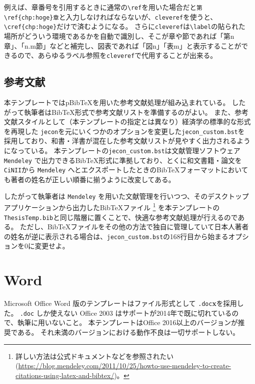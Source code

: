 				例えば、章番号を引用するときに通常の\verb|\ref|を用いた場合だと\verb|第\ref{chp:hoge}章|と入力しなければならないが、\texttt{cleveref}を使うと、\verb|\cref{chp:hoge}|だけで済むようになる。
				さらに\texttt{cleveref}は\verb|\label|の貼られた場所がどういう環境であるかを自動で識別し、そこが章や節であれば「第n章」、「n.m節」などと補完し、図表であれば「図n」「表m」と表示することができるので、あらゆるラベル参照を\texttt{cleveref}で代用することが出来る。


			\subsection{参考文献}
				\label{sub:bibtex}

				本テンプレートではpBibTeXを用いた参考文献処理が組み込まれている。
				したがって執筆者はBibTeX形式で参考文献リストを準備するのがよい。
				また、参考文献スタイルとして（本テンプレートの指定とは異なり）経済学の標準的な形式を再現した \texttt{jecon}を元にいくつかのオプションを変更した\texttt{jecon\_custom.bst}を採用しており、和書・洋書が混在した参考文献リストが見やすく出力されるようになっている。
				本テンプレートの\texttt{jecon\_custom.bst}は文献管理ソフトウェア \texttt{Mendeley} で出力できるBibTeX形式に準拠しており、とくに和文書籍・論文を \texttt{CiNII}から \texttt{Mendeley} へとエクスポートしたときのBibTeXフォーマットにおいても著者の姓名が正しい順番に揃うように改変してある。

				したがって執筆者は \texttt{Mendeley} を用いた文献管理を行いつつ、そのデスクトップアプリケーションから出力したBibTeXファイル
				\footnote{詳しい方法は公式ドキュメントなどを参照されたい
				(\url{https://blog.mendeley.com/2011/10/25/howto-use-mendeley-to-create-citations-using-latex-and-bibtex/})。}
				を本テンプレートの\texttt{ThesisTemp.bib}と同じ階層に置くことで、快適な参考文献処理が行えるのである。
				ただし、BibTeXファイルをその他の方法で独自に管理していて日本人著者の姓名が逆に表示される場合は、\verb|jecon_custom.bst|の168行目から始まるオプションを0に変更せよ。

	\section{Word}
		\label{word}

		Microsoft Office Word 版のテンプレートはファイル形式として \texttt{.doc}\textbf{x}を採用した。
		\texttt{.doc} しか使えない Office 2003 はサポートが2014年で既に切れているので、執筆に用いないこと。
		本テンプレートはOffice 2016以上のバージョンが推奨である。
		それ未満のバージョンにおける動作不良は一切サポートしない。

